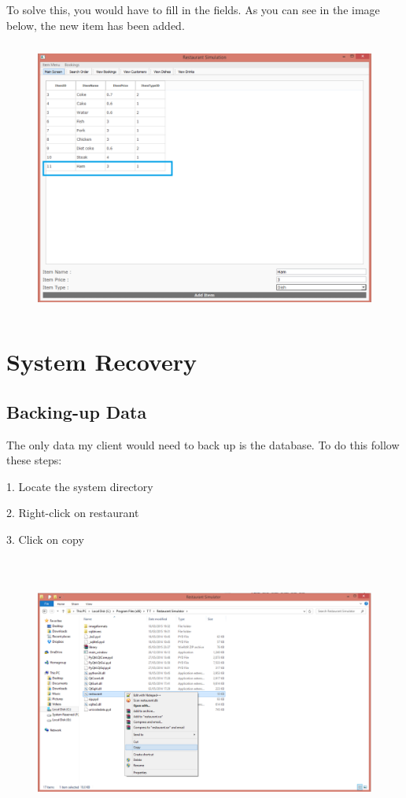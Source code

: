 To solve this, you would have to fill in the fields. As you can see in the image below, the new item has been added.

\begin{figure}[H]
    \includegraphics[height = 9cm]{./Manual/images/HamError3} 
    \caption{} \label{fig:hamerror3}
\end{figure}



\section{System Recovery}

\subsection{Backing-up Data}
The only data my client would need to back up is the database. To do this follow these steps:

1. Locate the system directory

2. Right-click on restaurant

3. Click on copy
\begin{figure}[H]
    \includegraphics[height = 9cm]{./Manual/images/backup} 
    \caption{} \label{fig:backup}
\end{figure}

